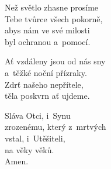 \begin{translatioMulticol}{3}
Než světlo zhasne prosíme\\
Tebe tvůrce všech pokorně,\\
abys nám ve své milosti\\
byl ochranou a~pomocí.\columnbreak

Ať vzdáleny jsou od nás sny\\
a~těžké noční přízraky.\\
Zdrť našeho nepřítele,\\
těla poskvrn ať ujdeme.\columnbreak

Sláva Otci, i~Synu\\
zrozenému, který z~mrtvých\\
vstal, i~Utěšiteli,\\
na věky věků.\\
Amen.
\end{translatioMulticol}

